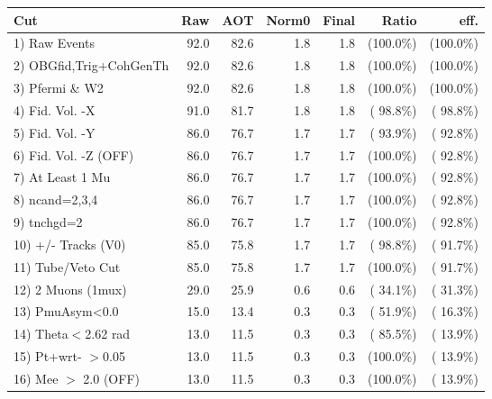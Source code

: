  \begin{table}[h!]\centering
 \begin{tabular}{||l||r|r|r|r|r|r||}
 \hline
 \hline
 Cut & Raw & AOT & Norm0 & Final & Ratio & eff.       \\
 \hline
  1) Raw Events           &         92.0 &         82.6 &          1.8 &          1.8 & (100.0\%) & (100.0\%) \\
  2) OBGfid,Trig+CohGenTh &         92.0 &         82.6 &          1.8 &          1.8 & (100.0\%) & (100.0\%) \\
  3) Pfermi \& W2         &         92.0 &         82.6 &          1.8 &          1.8 & (100.0\%) & (100.0\%) \\
  4) Fid. Vol. -X         &         91.0 &         81.7 &          1.8 &          1.8 & ( 98.8\%) & ( 98.8\%) \\
  5) Fid. Vol. -Y         &         86.0 &         76.7 &          1.7 &          1.7 & ( 93.9\%) & ( 92.8\%) \\
  6) Fid. Vol. -Z (OFF)   &         86.0 &         76.7 &          1.7 &          1.7 & (100.0\%) & ( 92.8\%) \\
  7) At Least 1 Mu        &         86.0 &         76.7 &          1.7 &          1.7 & (100.0\%) & ( 92.8\%) \\
  8) ncand=2,3,4          &         86.0 &         76.7 &          1.7 &          1.7 & (100.0\%) & ( 92.8\%) \\
  9) tnchgd=2             &         86.0 &         76.7 &          1.7 &          1.7 & (100.0\%) & ( 92.8\%) \\
 10) +/- Tracks (V0)      &         85.0 &         75.8 &          1.7 &          1.7 & ( 98.8\%) & ( 91.7\%) \\
 11) Tube/Veto Cut        &         85.0 &         75.8 &          1.7 &          1.7 & (100.0\%) & ( 91.7\%) \\
 12) 2 Muons (1mux)       &         29.0 &         25.9 &          0.6 &          0.6 & ( 34.1\%) & ( 31.3\%) \\
 13) PmuAsym<0.0          &         15.0 &         13.4 &          0.3 &          0.3 & ( 51.9\%) & ( 16.3\%) \\
 14) Theta$<$2.62 rad     &         13.0 &         11.5 &          0.3 &          0.3 & ( 85.5\%) & ( 13.9\%) \\
 15) Pt+wrt- $>$0.05      &         13.0 &         11.5 &          0.3 &          0.3 & (100.0\%) & ( 13.9\%) \\
 16) Mee $>$ 2.0  (OFF)   &         13.0 &         11.5 &          0.3 &          0.3 & (100.0\%) & ( 13.9\%) \\

\end{tabular}
\end{table}
